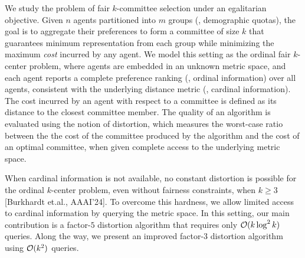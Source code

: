 

We study the problem of fair $k$-committee selection under an egalitarian objective. Given $n$ agents partitioned into $m$ groups (\eg, demographic quotas), the goal is to aggregate their preferences to form a committee of size $k$ that guarantees minimum representation from each group while minimizing the maximum \emph{cost} incurred by any agent.
We model this setting as the ordinal fair $k$-center problem, where agents are embedded in an unknown metric space, and each agent reports a complete preference ranking (\ie, ordinal information) over all agents, consistent with the underlying distance metric (\ie, cardinal information).
The cost incurred by an agent with respect to a committee is defined as its distance to the closest committee member.
The quality of an algorithm is evaluated using the notion of distortion, which measures the worst-case ratio between the the cost of the committee produced by the algorithm and  the cost of an optimal committee, when given complete access to the underlying metric space. 


When cardinal information is not available, no constant distortion is possible for the ordinal $k$-center problem, even without fairness constraints,  when $k\geq 3$ [Burkhardt et.al., AAAI'24]. 
To overcome this hardness, we allow limited access to cardinal information by querying the metric space. In this setting, our main contribution is a factor-$5$ distortion algorithm that requires only $\mathcal{O}(k \log^2 k)$ queries. Along the way, we present an improved factor-$3$ distortion algorithm using 
$\mathcal{O}(k^2)$ 
queries.

